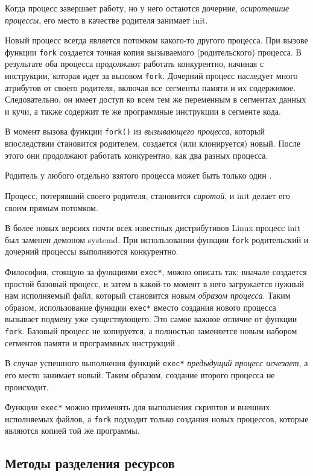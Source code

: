 \documentclass[%
	11pt,
	a4paper,
	utf8,
		]{article}
\begin{document}
Когда процесс завершает работу, но у него остаются дочерние, \emph{осиротевшие процессы}, его место в качестве родителя занимает init.

Новый процесс всегда является потомком какого-то другого процесса. При вызове функции \verb|fork| создается точная копия вызываемого (родительского) процесса. В результате оба процесса продолжают работать конкурентно, начиная с инструкции, которая идет за вызовом \verb|fork|. Дочерний процесс наследует много атрибутов от своего родителя, включая все сегменты памяти и их содержимое. Следовательно, он имеет доступ ко всем тем же переменным в сегментах данных и кучи, а также содержит те же программные инструкции в сегменте кода.

В момент вызова функции \verb|fork()| из \emph{вызывающего процесса}, который впоследствии становится родителем, создается (или клонируется) новый. После этого они продолжают работать конкурентно, как два разных процесса.

Родитель у любого отдельно взятого процесса может быть только один \cite[]{amini-extreme-c:2022}.

Процесс, потерявший своего родителя, становится \emph{сиротой}, и init делает его своим прямым потомком.

В более новых версиях почти всех известных дистрибутивов Linux процесс init был заменен демоном systemd. При использовании функции \verb|fork| родительский и дочерний процессы выполняются конкурентно.

Философия, стоящую за функциями \verb|exec*|, можно описать так: вначале создается простой базовый процесс, и затем в какой-то момент в него загружается нужный нам исполняемый файл, который становится новым \emph{образом процесса}. Таким образом, использование функции \verb|exec*| вместо создания нового процесса вызывает подмену уже существующего. Это самое важное отличие от функции \verb|fork|. Базовый процесс не копируется, а полностью заменяется новым набором сегментов памяти и программных инструкций \cite[]{amini-extreme-c:2022}.

В случае успешного выполнения функций \verb|exec*| \emph{предыдущий процесс исчезает}, а его место занимает новый. Таким образом, создание второго процесса не происходит.

Функции \verb|exec*| можно применять для выполнения скриптов и внешних исполняемых файлов, а \verb|fork| подходит только создания новых процессов, которые являются копией той же программы.

\subsection{Методы разделения ресурсов}
\end{document}
